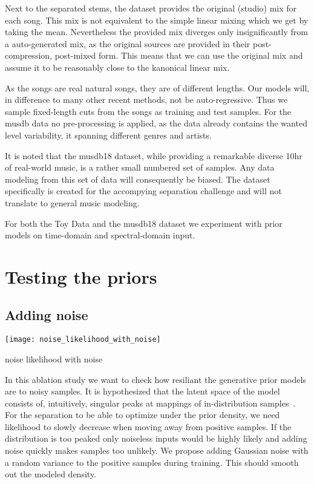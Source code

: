 Next to the separated stems, the dataset provides the original (studio) mix for each song. This mix is not equivalent to the simple linear mixing which we get by taking the mean. Nevertheless the provided mix diverges only insignificantly from a auto-generated mix, as the original sources are provided in their post-compression, post-mixed form. This means that we can use the original mix and assume it to be reasonably close to the kanonical linear mix.

As the songs are real natural songs, they are of different lengths. Our models will, in difference to many other recent methods, not be auto-regressive. Thus we sample fixed-length cuts from the songs as training and test samples. For the musdb data no pre-processing is applied, as the data already contains the wanted level variability, it spanning different genres and artists.

It is noted that the musdb18 dataset, while providing a remarkable diverse 10hr of real-world music, is a rather small numbered set of samples. Any data modeling from this set of data will consequently be biased. The dataset specifically is created for the accompying separation challenge and will not translate to general music modeling.

For both the Toy Data and the musdb18 dataset we experiment with prior models on time-domain and spectral-domain input.

\section{Testing the priors}

\subsection{Adding noise}
\begin{marginfigure}
    \texttt{[image: noise\_likelihood\_with\_noise]}%
    \caption{noise likelihood with noise}%
    \label{fig:noise_ll_noise}
\end{marginfigure}

In this ablation study we want to check how resiliant the generative prior models are to noisy samples. It is hypothesized that the latent space of the model consists of, intuitively, singular peaks at mappings of in-distribution samples~\cite{jayaramSource2020}. For the separation to be able to optimize under the prior density, we need likelihood to slowly decrease when moving away from positive samples. If the distribution is too peaked only noiseless inputs would be highly likely and adding noise quickly makes samples too unlikely. We propose adding Gaussian noise with a random variance to the positive samples during training. This should smooth out the modeled density.

